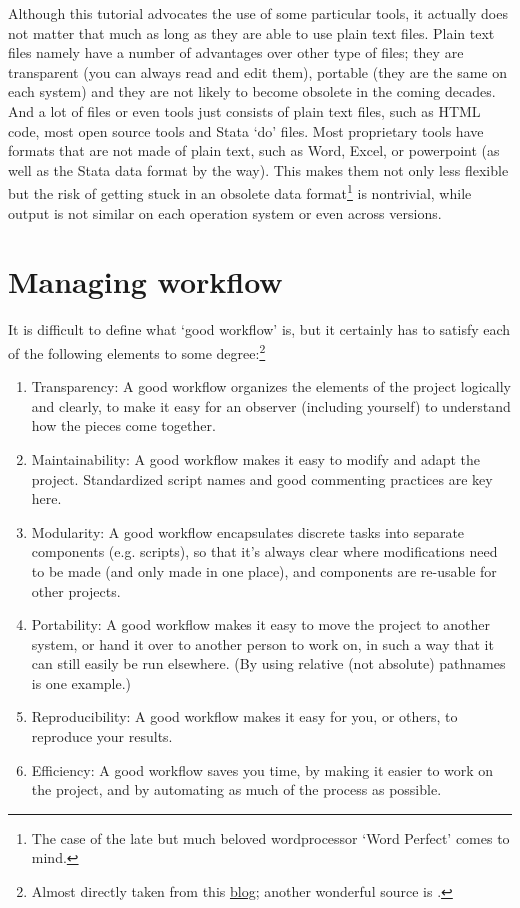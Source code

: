 \documentclass[preprint,authoryear,5p]{elsarticle}
\begin{document}
Although this tutorial advocates the use of some particular tools, it actually does not matter that much as long as they are able to use plain text files. Plain text files namely have a number of advantages over other type of files; they are transparent (you can always read and edit them), portable (they are the same on each system) and they are not likely to become obsolete in the coming decades. And a lot of files or even tools just consists of plain text files, such as HTML code, most open source tools and Stata `do' files. Most proprietary tools have formats that are not made of plain text, such as Word, Excel, or powerpoint (as well as the Stata data format by the way). This makes them not only less flexible but the risk of getting stuck in an obsolete data format\footnote{The case of the late but much beloved wordprocessor `Word Perfect' comes to mind.} is nontrivial, while output is not similar on each operation system or even across versions. 

\section{Managing workflow} It is difficult to define what `good workflow' is, but it certainly has to satisfy each of the following elements to some degree:\footnote{Almost directly taken from this \href{http://blog.revolutionanalytics.com/2010/10/a-workflow-for-r.html}{blog}; another wonderful source is \citet{Healy2013}.} 
\begin{enumerate}
	\item Transparency: A good workflow organizes the elements of the project logically and clearly, to make it easy for an observer (including yourself) to understand how the pieces come together. 
	\item Maintainability: A good workflow makes it easy to modify and adapt the project. Standardized script names and good commenting practices are key here. 
	\item Modularity: A good workflow encapsulates discrete tasks into separate components (e.g. scripts), so that it's always clear where modifications need to be made (and only made in one place), and components are re-usable for other projects. 
	\item Portability: A good workflow makes it easy to move the project to another system, or hand it over to another person to work on, in such a way that it can still easily be run elsewhere. (By using relative (not absolute) pathnames is one example.) 
	\item Reproducibility: A good workflow makes it easy for you, or others, to reproduce your results. 
	\item Efficiency: A good workflow saves you time, by making it easier to work on the project, and by automating as much of the process as possible. 
\end{enumerate}
\end{document}
